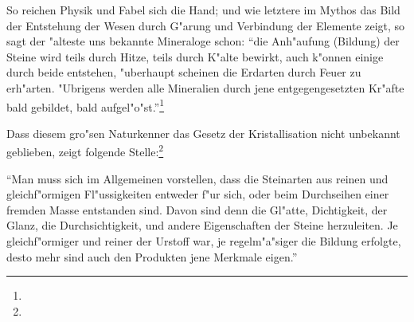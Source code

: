 \documentclass[a4paper, 11pt, oneside, polutonikogreek, german]{article}
\begin{document}
So reichen Physik und Fabel sich die Hand; und wie letztere im Mythos das Bild der Entstehung der Wesen durch G"arung und Verbindung der Elemente zeigt, so sagt der "alteste uns bekannte Mineraloge schon: "`die Anh"aufung (Bildung) der Steine wird teils durch Hitze, teils durch K"alte bewirkt, auch k"onnen einige durch beide entstehen, "uberhaupt scheinen die Erdarten durch Feuer zu erh"arten. "Ubrigens werden alle Mineralien durch jene entgegengesetzten Kr"afte bald gebildet, bald aufgel"o"st."'\footnote{}

Dass diesem gro"sen Naturkenner das Gesetz der Kristallisation nicht unbekannt geblieben, zeigt folgende Stelle:\footnote{}

"`Man muss sich im Allgemeinen vorstellen, dass die Steinarten aus reinen und gleichf"ormigen Fl"ussigkeiten entweder f"ur sich, oder beim Durchseihen einer fremden Masse entstanden sind. Davon sind denn die Gl"atte, Dichtigkeit, der Glanz, die Durchsichtigkeit, und andere Eigenschaften der Steine herzuleiten. Je gleichf"ormiger und reiner der Urstoff war, je regelm"a"siger die Bildung erfolgte, desto mehr sind auch den Produkten jene Merkmale eigen."'
\end{document}
